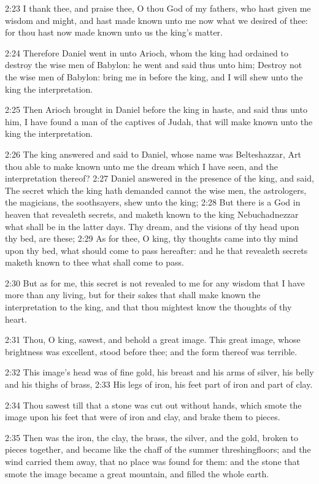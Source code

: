 2:23 I thank thee, and praise thee, O thou God of my fathers, who hast
given me wisdom and might, and hast made known unto me now what we
desired of thee: for thou hast now made known unto us the king's
matter.

2:24 Therefore Daniel went in unto Arioch, whom the king had ordained
to destroy the wise men of Babylon: he went and said thus unto him;
Destroy not the wise men of Babylon: bring me in before the king, and
I will shew unto the king the interpretation.

2:25 Then Arioch brought in Daniel before the king in haste, and said
thus unto him, I have found a man of the captives of Judah, that will
make known unto the king the interpretation.

2:26 The king answered and said to Daniel, whose name was
Belteshazzar, Art thou able to make known unto me the dream which I
have seen, and the interpretation thereof?  2:27 Daniel answered in
the presence of the king, and said, The secret which the king hath
demanded cannot the wise men, the astrologers, the magicians, the
soothsayers, shew unto the king; 2:28 But there is a God in heaven
that revealeth secrets, and maketh known to the king Nebuchadnezzar
what shall be in the latter days. Thy dream, and the visions of thy
head upon thy bed, are these; 2:29 As for thee, O king, thy thoughts
came into thy mind upon thy bed, what should come to pass hereafter:
and he that revealeth secrets maketh known to thee what shall come to
pass.

2:30 But as for me, this secret is not revealed to me for any wisdom
that I have more than any living, but for their sakes that shall make
known the interpretation to the king, and that thou mightest know the
thoughts of thy heart.

2:31 Thou, O king, sawest, and behold a great image. This great image,
whose brightness was excellent, stood before thee; and the form
thereof was terrible.

2:32 This image's head was of fine gold, his breast and his arms of
silver, his belly and his thighs of brass, 2:33 His legs of iron, his
feet part of iron and part of clay.

2:34 Thou sawest till that a stone was cut out without hands, which
smote the image upon his feet that were of iron and clay, and brake
them to pieces.

2:35 Then was the iron, the clay, the brass, the silver, and the gold,
broken to pieces together, and became like the chaff of the summer
threshingfloors; and the wind carried them away, that no place was
found for them: and the stone that smote the image became a great
mountain, and filled the whole earth.

